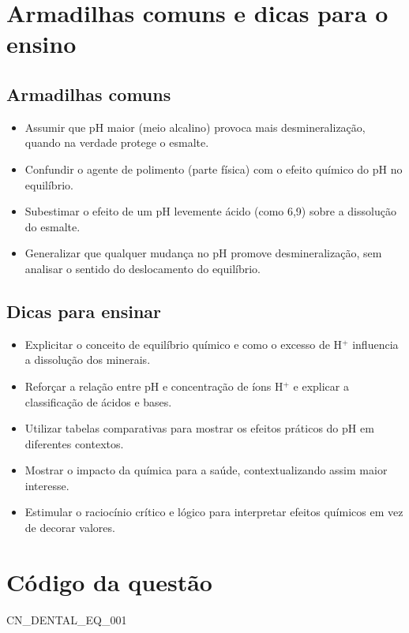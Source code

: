 \documentclass{article}
\begin{document}
\section*{Armadilhas comuns e dicas para o ensino}
\subsection*{Armadilhas comuns}
\begin{itemize}
  \item Assumir que pH maior (meio alcalino) provoca mais desmineralização, quando na verdade protege o esmalte.
  \item Confundir o agente de polimento (parte física) com o efeito químico do pH no equilíbrio.
  \item Subestimar o efeito de um pH levemente ácido (como 6,9) sobre a dissolução do esmalte.
  \item Generalizar que qualquer mudança no pH promove desmineralização, sem analisar o sentido do deslocamento do equilíbrio.
\end{itemize}

\subsection*{Dicas para ensinar}
\begin{itemize}
  \item Explicitar o conceito de equilíbrio químico e como o excesso de H$^{+}$ influencia a dissolução dos minerais.
  \item Reforçar a relação entre pH e concentração de íons H$^{+}$ e explicar a classificação de ácidos e bases.
  \item Utilizar tabelas comparativas para mostrar os efeitos práticos do pH em diferentes contextos.
  \item Mostrar o impacto da química para a saúde, contextualizando assim maior interesse.
  \item Estimular o raciocínio crítico e lógico para interpretar efeitos químicos em vez de decorar valores.
\end{itemize}

\section*{Código da questão}
CN\_DENTAL\_EQ\_001
\end{document}
